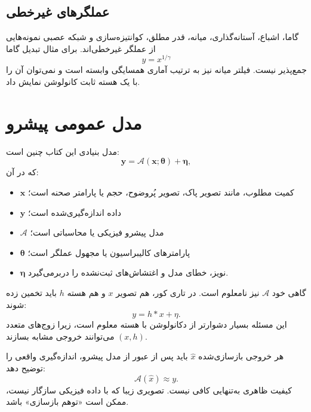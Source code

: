 \documentclass[12pt,openany,oneside]{book}
\newcommand{\vect}[1]{\bm{#1}}
\newcommand{\op}[1]{\mathcal{#1}}
\begin{document}
\subsection{عملگرهای غیرخطی}

گاما، اشباع، آستانه‌گذاری، میانه، قدر مطلق، کوانتیزه‌سازی و شبکه عصبی نمونه‌هایی از عملگر غیرخطی‌اند.
برای مثال تبدیل گاما
\begin{equation}
y=x^{1/\gamma}
\end{equation}
جمع‌پذیر نیست. فیلتر میانه نیز به ترتیب آماری همسایگی وابسته است و نمی‌توان آن را با یک هسته ثابت کانولوشن نمایش داد.

\section{مدل عمومی پیشرو}

مدل بنیادی این کتاب چنین است:
\begin{equation}
\vect y=\op A(\vect x;\vect\theta)+\vect\eta,
\label{eq:general-forward}
\end{equation}
که در آن:
\begin{itemize}
\item \(\vect x\) کمیت مطلوب، مانند تصویر پاک، تصویر پُروضوح، حجم یا پارامتر صحنه است؛
\item \(\vect y\) داده اندازه‌گیری‌شده است؛
\item \(\op A\) مدل پیشرو فیزیکی یا محاسباتی است؛
\item \(\vect\theta\) پارامترهای کالیبراسیون یا مجهول عملگر است؛
\item \(\vect\eta\) نویز، خطای مدل و اغتشاش‌های ثبت‌نشده را دربرمی‌گیرد.
\end{itemize}

گاهی خود \(\op A\) نیز نامعلوم است. در تاری کور، هم تصویر \(x\) و هم هسته \(h\) باید تخمین زده شوند:
\begin{equation}
y=h*x+\eta.
\end{equation}
این مسئله بسیار دشوارتر از دکانولوشن با هسته معلوم است، زیرا زوج‌های متعدد \((x,h)\) می‌توانند خروجی مشابه بسازند.

\begin{keybox}
هر خروجی بازسازی‌شده \(\widehat x\) باید پس از عبور از مدل پیشرو، اندازه‌گیری واقعی را توضیح دهد:
\begin{equation}
\op A(\widehat x)\approx y.
\end{equation}
کیفیت ظاهری به‌تنهایی کافی نیست. تصویری زیبا که با داده فیزیکی سازگار نیست، ممکن است «توهم بازسازی» باشد.
\end{keybox}
\end{document}
